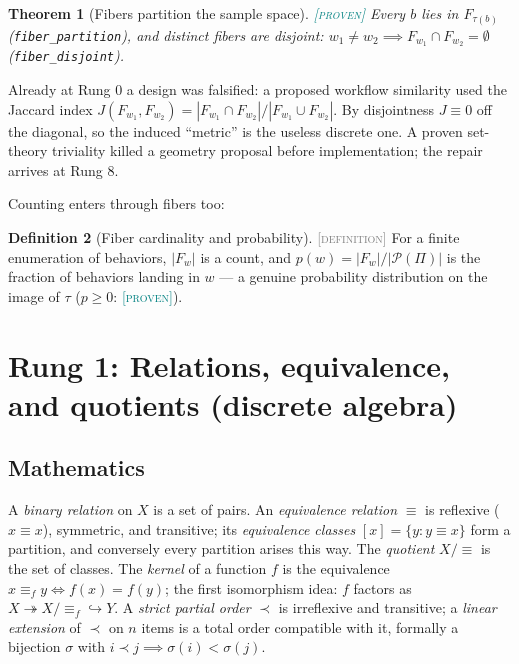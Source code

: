 \documentclass[11pt]{article}
\newcommand{\PROVEN}{\textcolor{teal}{\textsc{[proven]}}}
\newcommand{\DEFINITION}{\textcolor{gray}{\textsc{[definition]}}}
\newcommand{\PT}{\Pi}
\newcommand{\PS}{\mathcal{P}(\PT)}
\newcommand{\fib}[1]{F_{#1}}
\theoremstyle{plain}
\newtheorem{theorem}{Theorem}[section]
\theoremstyle{definition}
\newtheorem{definition}[theorem]{Definition}
\theoremstyle{remark}
\begin{document}
\begin{theorem}[Fibers partition the sample space]\PROVEN\;
Every $b$ lies in $\fib{\tau(b)}$ (\texttt{fiber\_partition}), and distinct
fibers are disjoint: $w_1 \ne w_2 \implies \fib{w_1} \cap \fib{w_2} =
\emptyset$ (\texttt{fiber\_disjoint}).
\end{theorem}

Already at Rung 0 a design was falsified: a proposed workflow similarity
used the Jaccard index $J(\fib{w_1}, \fib{w_2}) =
|\fib{w_1} \cap \fib{w_2}| / |\fib{w_1} \cup \fib{w_2}|$. By disjointness
$J \equiv 0$ off the diagonal, so the induced ``metric'' is the useless
discrete one. A proven set-theory triviality killed a geometry proposal
before implementation; the repair arrives at Rung 8.

Counting enters through fibers too:
\begin{definition}[Fiber cardinality and probability]\DEFINITION\;
For a finite enumeration of behaviors,
$|\fib{w}|$ is a count, and $p(w) = |\fib{w}| / |\PS|$ is the fraction of
behaviors landing in $w$ --- a genuine probability distribution on the image
of $\tau$ ($p \ge 0$: \PROVEN).
\end{definition}

\section{Rung 1: Relations, equivalence, and quotients (discrete algebra)}
\label{sec:rung1}

\subsection{Mathematics}
A \emph{binary relation} on $X$ is a set of pairs. An \emph{equivalence
relation} $\equiv$ is reflexive ($x \equiv x$), symmetric, and transitive;
its \emph{equivalence classes} $[x] = \{y : y \equiv x\}$ form a partition,
and conversely every partition arises this way. The \emph{quotient}
$X/{\equiv}$ is the set of classes. The \emph{kernel} of a function $f$ is
the equivalence $x \equiv_f y \iff f(x) = f(y)$; the first isomorphism
idea: $f$ factors as $X \twoheadrightarrow X/{\equiv_f} \hookrightarrow Y$.
A \emph{strict partial order} $\prec$ is irreflexive and transitive; a
\emph{linear extension} of $\prec$ on $n$ items is a total order
compatible with it, formally a bijection $\sigma$ with
$i \prec j \implies \sigma(i) < \sigma(j)$.
\end{document}
